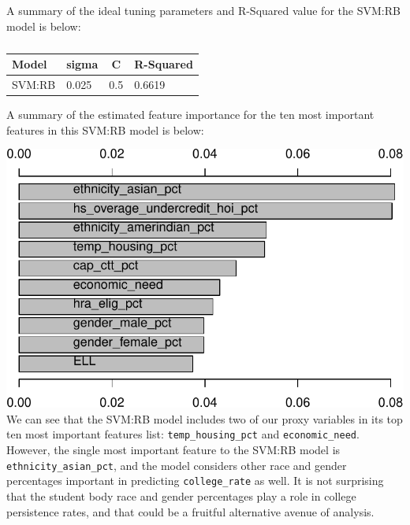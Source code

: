 \documentclass[
  man,floatsintext]{apa6}
\begin{document}
A summary of the ideal tuning parameters and R-Squared value for the SVM:RB model is below:

\begin{table}[H]

\begin{center}
\begin{threeparttable}

\caption{\label{tab:unnamed-chunk-8}}

\begin{tabular}{llll}
\toprule
Model & \multicolumn{1}{c}{sigma} & \multicolumn{1}{c}{C} & \multicolumn{1}{c}{R-Squared}\\
\midrule
SVM:RB & 0.025 & 0.5 & 0.6619\\
\bottomrule
\end{tabular}

\end{threeparttable}
\end{center}

\end{table}

A summary of the estimated feature importance for the ten most important features in this SVM:RB model is below:

\includegraphics{final-project_files/figure-latex/unnamed-chunk-9-1.pdf}
We can see that the SVM:RB model includes two of our proxy variables in its top ten most important features list: \texttt{temp\_housing\_pct} and \texttt{economic\_need}. However, the single most important feature to the SVM:RB model is \texttt{ethnicity\_asian\_pct}, and the model considers other race and gender percentages important in predicting \texttt{college\_rate} as well. It is not surprising that the student body race and gender percentages play a role in college persistence rates, and that could be a fruitful alternative avenue of analysis.
\end{document}
